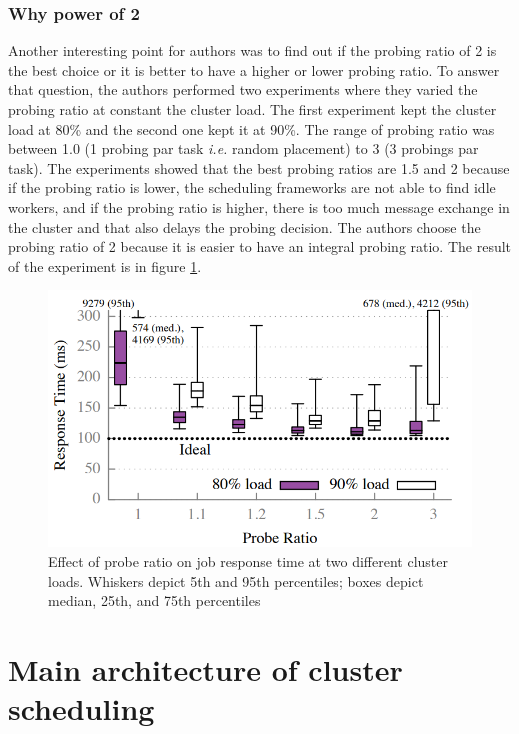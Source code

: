 \documentclass[11pt]{article}
\begin{document}
        
        \subsubsection*{Why power of 2}
        	\label{probingratio}
        
        Another interesting point for authors was to find out if the probing ratio of 2 is the best choice or it is better to have a higher or lower probing ratio. To answer that question, the authors performed two experiments where they varied the probing ratio at constant the cluster load. The first experiment kept the cluster load at 80\% and the second one kept it at 90\%. The range of probing ratio was between 1.0 (1 probing par task \textit{i.e.} random placement) to 3 (3 probings par task). The experiments showed that the best probing ratios are 1.5 and 2 because if the probing ratio is lower, the scheduling frameworks are not able to find idle workers, and if the probing ratio is higher, there is too much message exchange in the cluster and that also delays the probing decision. The authors choose the probing ratio of 2 because it is easier to have an integral probing ratio. The result of the experiment is in figure \ref{fig6}.
        
        \begin{figure}
        		\includegraphics[scale=.5]{fig6}
        		\caption{Effect of probe ratio on job response time at two different cluster loads. Whiskers depict 5th and 95th percentiles; boxes depict median, 25th, and 75th percentiles}
        		\label{fig6}
        \end{figure}


\section{Main architecture of cluster scheduling}
\end{document}
